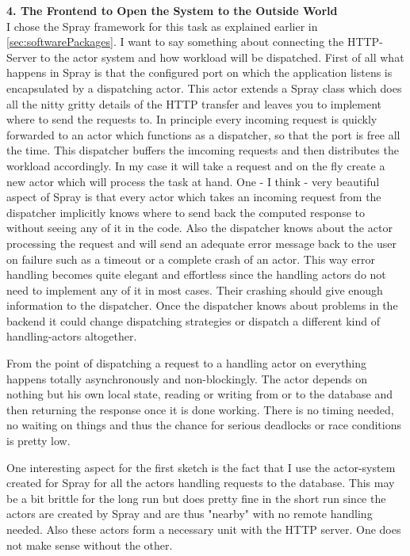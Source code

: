 \documentclass[twoside, 11pt]{scrartcl}
\begin{document}
\textbf{4. The Frontend to Open the System to the Outside World}\\
I chose the Spray framework for this task as explained earlier in \ref{sec:softwarePackages}. I want to say something about connecting the HTTP-Server to the actor system and how workload will be dispatched.
First of all what happens in Spray is that the configured port on which the application listens is encapsulated by a dispatching actor. This actor extends a Spray class which does all the nitty gritty details of the HTTP transfer and leaves you to implement where to send the requests to. In principle every incoming request  is quickly forwarded to an actor which functions as a dispatcher, so that the port is free all the time. This dispatcher buffers the imcoming requests and then distributes the workload accordingly. In my case it will take a request and on the fly create a new actor which will process the task at hand. One - I think - very beautiful aspect of Spray is that every actor which takes an incoming request from the dispatcher implicitly knows where to send back the computed response to without seeing any of it in the code. Also the dispatcher knows about the actor processing the request and will send an adequate error message back to the user on failure such as a timeout or a complete crash of an actor. This way error handling becomes quite elegant and effortless since the handling actors do not need to implement any of it in most cases. Their crashing should give enough information to the dispatcher. Once the dispatcher knows about problems in the backend it could change dispatching strategies or dispatch a different kind of handling-actors altogether.

From the point of dispatching a request to a handling actor on everything happens totally asynchronously and non-blockingly. The actor depends on nothing but his own local state, reading or writing from or to the database and then returning the response once it is done working. There is no timing needed, no waiting on things and thus the chance for serious deadlocks or race conditions is pretty low.

One interesting aspect for the first sketch is the fact that I use the actor-system created for Spray for all the actors handling requests to the database. This may be a bit brittle for the long run but does pretty fine in the short run since the actors are created by Spray and are thus "nearby" with no remote handling needed. Also these actors form a necessary unit with the HTTP server. One does not make sense without the other.
\end{document}
